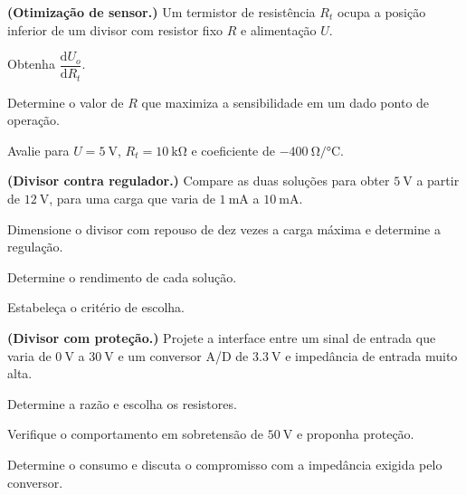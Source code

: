 \begin{questao}[4]{}

\textbf{(Otimização de sensor.)} Um termistor de resistência $R_t$ ocupa a
posição inferior de um divisor com resistor fixo $R$ e alimentação $U$.
\begin{itensq}
\item Obtenha $\dfrac{\mathrm{d}U_o}{\mathrm{d}R_t}$.
\item Determine o valor de $R$ que maximiza a sensibilidade em um dado ponto de
      operação.
\item Avalie para $U=\SI{5}{\volt}$, $R_t=\SI{10}{\kilo\ohm}$ e coeficiente de
      $\SI{-400}{\ohm\per\celsius}$.
\end{itensq}


\end{questao}
\begin{questao}[4]{}

\textbf{(Divisor contra regulador.)} Compare as duas soluções para obter
$\SI{5}{\volt}$ a partir de $\SI{12}{\volt}$, para uma carga que varia de
$\SI{1}{\milli\ampere}$ a $\SI{10}{\milli\ampere}$.
\begin{itensq}
\item Dimensione o divisor com repouso de dez vezes a carga máxima e determine
      a regulação.
\item Determine o rendimento de cada solução.
\item Estabeleça o critério de escolha.
\end{itensq}


\end{questao}
\begin{questao}[4]{}

\textbf{(Divisor com proteção.)} Projete a interface entre um sinal de entrada
que varia de $\SI{0}{\volt}$ a $\SI{30}{\volt}$ e um conversor A/D de
$\SI{3.3}{\volt}$ e impedância de entrada muito alta.
\begin{itensq}
\item Determine a razão e escolha os resistores.
\item Verifique o comportamento em sobretensão de $\SI{50}{\volt}$ e proponha
      proteção.
\item Determine o consumo e discuta o compromisso com a impedância exigida pelo
      conversor.
\end{itensq}


\end{questao}

